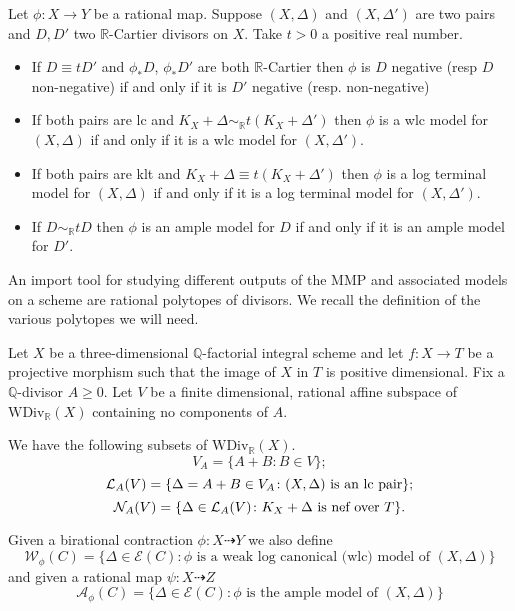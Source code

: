 \documentclass[a4paper,12pt]{book}
\begin{document}
\begin{lemma}\label{equiv}\cite[Lemma 3.6.8]{birkar2010existence}
	Let $\phi:X \to Y$ be a rational map. Suppose $(X,\Delta)$ and $(X,\Delta')$ are two pairs and $D,D'$ two $\mathbb{R}$-Cartier divisors on $X$. Take $t >0$ a positive real number.
	\begin{itemize}
		\item If $D \equiv tD'$ and $\phi_{*}D$, $\phi_{*}D'$ are both $\mathbb{R}$-Cartier then $\phi$ is $D$ negative (resp $D$ non-negative) if and only if it is $D'$ negative (resp. non-negative)
		\item If both pairs are lc and $K_{X}+\Delta \sim_{\mathbb{R}} t(K_{X}+\Delta')$ then $\phi$ is a wlc model for $(X,\Delta)$ if and only if it is a wlc model for $(X,\Delta')$.
		\item If both pairs are klt and $K_{X}+\Delta \equiv t(K_{X}+\Delta')$ then $\phi$ is a log terminal model for $(X,\Delta)$ if and only if it is a log terminal model for $(X,\Delta')$.
		\item If $D\sim_{\mathbb{R}} tD$ then $\phi$ is an ample model for $D$ if and only if it is an ample model for $D'$.
	\end{itemize}
\end{lemma}

An import tool for studying different outputs of the MMP and associated models on a scheme are rational polytopes of divisors. We recall the definition of the various polytopes we will need.

\begin{definition}
	Let  $X$ be a three-dimensional $\mathbb{Q}$-factorial integral scheme and let $f \colon X \to T$ be a projective morphism such that the image of $X$ in $T$ is positive dimensional. 
	Fix a $\mathbb{Q}$-divisor $A\geq 0$. Let $V$ be a finite dimensional, rational affine subspace of $\text{WDiv}_{\mathbb{R}}(X)$ containing no components of $A$.
	
	We have the following subsets of $\text{WDiv}_\mathbb{R}(X)$.
	\[V_{A}= \{A+B \colon B \in V\};\]
	\[\mathcal{L}_{A}(V)=\{\Delta=A+B \in V_{A} \colon (X,\Delta) \textup{ is an lc pair}\};\]
	\[\mathcal{N}_{A}(V)=\{\Delta \in \mathcal{L}_{A}(V) \colon K_{X}+\Delta \textup{ is nef over } T\}.\]
	
	Given a birational contraction $\phi:X \dashrightarrow Y$ we also define
	\[\mathcal{W}_{\phi}(C)=\{\Delta \in \mathcal{E}(C): \phi \text{ is a weak log canonical (wlc) model of } (X,\Delta)\}\]
	and given a rational map $\psi:X \dashrightarrow Z$
	\[\mathcal{A}_{\phi}(C)=\{\Delta \in \mathcal{E}(C): \phi \text{ is the ample model of } (X,\Delta)\}\]
\end{definition}
\end{document}
